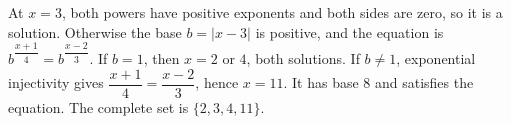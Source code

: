 At $ x=3 $, both powers have positive exponents and both sides are zero, so it is a solution. Otherwise the base $ b=|x-3|$ is positive, and the equation is $ b^{\dfrac{x+1}{4}}=b^{\dfrac{x-2}{3}}$. If $ b=1 $, then $ x=2 $ or $ 4 $, both solutions. If $ b\ne1 $, exponential injectivity gives $\dfrac{x+1}{4}=\dfrac{x-2}{3}$, hence $ x=11 $. It has base $ 8 $ and satisfies the equation. The complete set is $\boxed{\{2,3,4,11\}}$.
